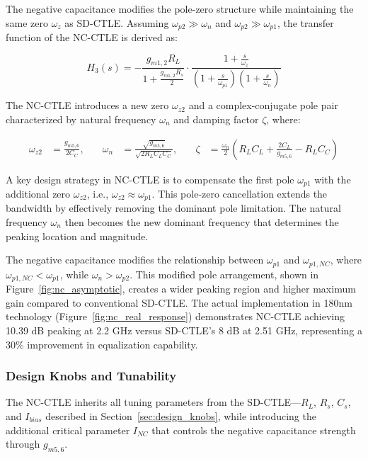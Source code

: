 The negative capacitance modifies the pole-zero structure while maintaining the same zero $\omega_z$ as SD-CTLE. Assuming $\omega_{p2} \gg \omega_n$ and $\omega_{p2} \gg \omega_{p1}$, the transfer function of the NC-CTLE is derived as:

\[
H_3(s) = -\frac{g_{m1,2}R_L}{1 + \frac{g_{m1,2}R_s}{2}} \cdot \frac{1 + \frac{s}{\omega_z}}{(1 + \frac{s}{\omega_{p1}})(1 + \frac{s}{\omega_n})}
\]

The NC-CTLE introduces a new zero $\omega_{z2}$ and a complex-conjugate pole pair characterized by natural frequency $\omega_n$ and damping factor $\zeta$, where:

\[
\begin{aligned}
\omega_{z2} &= \frac{g_{m5,6}}{2C_C}, &\quad
\omega_n &= \frac{\sqrt{g_{m5,6}}}{\sqrt{2R_LC_LC_C}}, &\quad
\zeta &= \frac{\omega_n}{2} \left( R_LC_L + \frac{2C_L}{g_{m5,6}} - R_LC_C \right)
\end{aligned}
\]

A key design strategy in NC-CTLE is to compensate the first pole $\omega_{p1}$ with the additional zero $\omega_{z2}$, i.e., $\omega_{z2} \approx \omega_{p1}$. This pole-zero cancellation extends the bandwidth by effectively removing the dominant pole limitation. The natural frequency $\omega_n$ then becomes the new dominant frequency that determines the peaking location and magnitude.

The negative capacitance modifies the relationship between $\omega_{p1}$ and $\omega_{p1,NC}$, where $\omega_{p1,NC} < \omega_{p1}$, while $\omega_n > \omega_{p2}$. This modified pole arrangement, shown in Figure~\ref{fig:nc_asymptotic}, creates a wider peaking region and higher maximum gain compared to conventional SD-CTLE. The actual implementation in 180nm technology (Figure~\ref{fig:nc_real_response}) demonstrates NC-CTLE achieving 10.39 dB peaking at 2.2 GHz versus SD-CTLE's 8 dB at 2.51 GHz, representing a 30\% improvement in equalization capability.

\subsubsection{Design Knobs and Tunability}

The NC-CTLE inherits all tuning parameters from the SD-CTLE—$R_L$, $R_s$, $C_s$, and $I_{bias}$ described in Section~\ref{sec:design_knobs}, while introducing the additional critical parameter $I_{NC}$ that controls the negative capacitance strength through $g_{m5,6}$.

